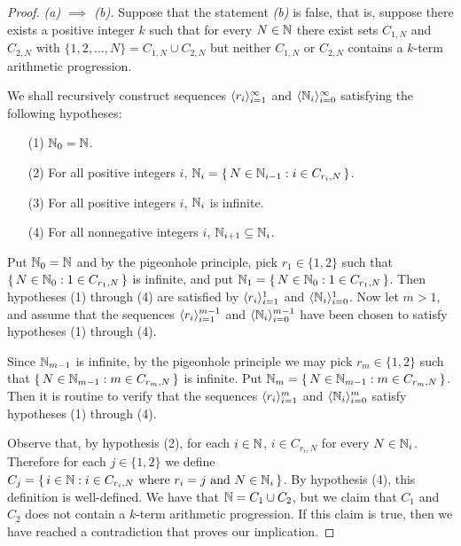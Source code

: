 \begin{proof}
  \textsl{(a) $\implies$ (b).}
  Suppose that the statement \textsl{(b)} is false, that is, suppose there exists a positive integer $k$ such that for every $N \in \mathbb{N}$ there exist sets $C_{1,N}$ and $C_{2,N}$ with $\{1, 2, \ldots, N\} = C_{1, N} \cup C_{2, N}$ but neither $C_{1,N}$ or $C_{2,N}$ contains a $k$-term arithmetic progression. 

  We shall recursively construct sequences $\langle r_i \rangle_{i=1}^\infty$ and $\langle \mathbb{N}_i \rangle_{i=0}^\infty$ satisfying the following hypotheses:
  \begin{itemize}
    \item[(1)]
      $\mathbb{N}_0 = \mathbb{N}$.

    \item[(2)]
      For all positive integers $i$, $\mathbb{N}_i = \{\, N \in \mathbb{N}_{i-1} : i \in C_{r_i, N} \,\}$.

    \item[(3)]
      For all positive integers $i$, $\mathbb{N}_i$ is infinite.

    \item[(4)] 
      For all nonnegative integers $i$, $\mathbb{N}_{i+1} \subseteq \mathbb{N}_i$.
  \end{itemize}

  Put $\mathbb{N}_0 = \mathbb{N}$ and by the pigeonhole principle, pick $r_1 \in \{1, 2 \}$ such that $\{\, N \in \mathbb{N}_0 : 1 \in C_{r_1, N} \,\}$ is infinite, and put $\mathbb{N}_1 = \{\, N \in \mathbb{N}_0 : 1 \in C_{r_1, N} \,\}$.
  Then hypotheses (1) through (4) are satisfied by $\langle r_i \rangle_{i=1}^1$ and $\langle \mathbb{N}_i \rangle_{i=0}^1$.
  Now let $m > 1$, and assume that the sequences $\langle r_i \rangle_{i=1}^{m-1}$ and $\langle \mathbb{N}_i \rangle_{i=0}^{m-1}$ have been chosen to satisfy hypotheses (1) through (4).
  
  Since $\mathbb{N}_{m-1}$ is infinite, by the pigeonhole principle we may pick $r_m \in \{1, 2\}$ such that $\{\, N \in \mathbb{N}_{m-1} : m \in C_{r_m, N} \,\}$ is infinite. 
  Put $\mathbb{N}_m = \{\, N \in \mathbb{N}_{m-1} : m \in C_{r_m, N} \,\}$.
  Then it is routine to verify that the sequences $\langle r_i \rangle_{i=1}^m$ and $\langle \mathbb{N}_i \rangle_{i=0}^m$ satisfy hypotheses (1) through (4).

  Observe that, by hypothesis (2), for each $i \in \mathbb{N}$, $i \in C_{r_i, N}$ for every $N \in \mathbb{N}_i$.
  Therefore for each $j \in \{1, 2\}$ we define $C_j = \{\, i \in \mathbb{N} : \mbox{$i \in C_{r_i, N}$ where $r_i = j$ and $N \in \mathbb{N}_i$} \,\}$.
  By hypothesis (4), this definition is well-defined.
  We have that $\mathbb{N} = C_1 \cup C_2$, but we claim that $C_1$ and $C_2$ does not contain a $k$-term arithmetic progression. 
  If this claim is true, then we have reached a contradiction that proves our implication.


\end{proof}
